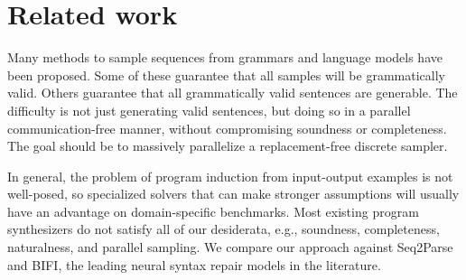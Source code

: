 \documentclass[runningheads]{llncs}
\begin{document}
\section{Related work}

Many methods to sample sequences from grammars and language models have been proposed. Some of these guarantee that all samples will be grammatically valid. Others guarantee that all grammatically valid sentences are generable. The difficulty is not just generating valid sentences, but doing so in a parallel communication-free manner, without compromising soundness or completeness. The goal should be to massively parallelize a replacement-free discrete sampler.

In general, the problem of program induction from input-output examples is not well-posed, so specialized solvers that can make stronger assumptions will usually have an advantage on domain-specific benchmarks. Most existing program synthesizers do not satisfy all of our desiderata, e.g., soundness, completeness, naturalness, and parallel sampling. We compare our approach against Seq2Parse and BIFI, the leading neural syntax repair models in the literature.\vspace{-0.5cm}

\newcommand{\tidyparse}{\href{https://github.com/tidyparse/tidyparse}{Tidyparse}~\cite{considine2023pragmatic}}
\newcommand{\seqtoparse}{\href{https://github.com/gsakkas/seq2parse}{Seq2Parse}~\cite{sakkas2022seq2parse}}
\newcommand{\bifi}{\href{https://github.com/michiyasunaga/BIFI}{BIFI}~\cite{yasunaga2021break}}
\newcommand{\ordinalfix}{\href{https://github.com/myxxxsquared/OrdinalFix}{OrdinalFix}~\cite{zhang2023ordinalfix}}
\newcommand{\ahopeterson}{\href{https://epubs.siam.org/doi/10.1137/0201022}{Aho \& Peterson}~\cite{aho1972minimum}}
\newcommand{\diekmanntratt}{\href{https://github.com/softdevteam/error_recovery_experiment}{Don't panic!}~\cite{diekmann2018dont}}
\newcommand{\outlines}{\href{https://github.com/dottxt-ai/outlines}{Outlines}~\cite{willard2023efficient}}
\newcommand{\syncode}{\href{https://github.com/uiuc-focal-lab/syncode}{SynCode}~\cite{ugare2024improving}}
\newcommand{\gad}{\href{https://arxiv.org/pdf/2405.21047}{GAD}~\cite{park2024grammar}}
\newcommand{\codeguard}{\href{https://arxiv.org/pdf/2405.00218}{CodeGuard+}~\cite{fu2024constrained}}
\newcommand{\flap}{\href{https://arxiv.org/pdf/2403.05766}{FLAP}~\cite{roy2024flap}}
\newcommand{\domino}{\href{https://arxiv.org/pdf/2403.06988}{DOMINO}~\cite{beurer2024guiding}}
\newcommand{\guidance}{\href{https://github.com/guidance-ai/guidance}{Guidance}}
\newcommand{\llamacpp}{\href{https://github.com/ggerganov/llama.cpp}{llama.cpp}}
\end{document}
